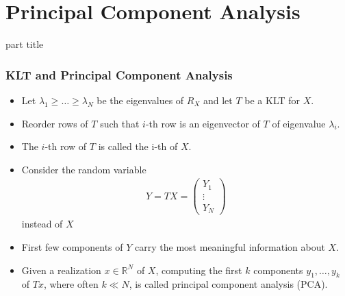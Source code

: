 \section{Principal Component Analysis}

\begin{frame}
 \vspace{12.0ex}
\begin{center}
\begin{beamercolorbox}[sep=12pt,center]{part title}
\insertsection\par
\end{beamercolorbox}
\end{center}
\end{frame}




\begin{frame}\frametitle{KLT and Principal Component Analysis}
\begin{itemize}
\item Let $\lambda_1\geq\dots\geq \lambda_N$ be the eigenvalues of $R_X$ and let $T$ be a KLT for $X$. 
\item Reorder 
rows of $T$ such that $i$-th row is an eigenvector of $T$ of eigenvalue $\lambda_i$.
\item The $i$-th row of $T$ is called the i-th  of $X$. 
\item Consider the random variable 
\begin{align*}
Y=TX=\begin{pmatrix}Y_1\\ \vdots\\Y_N\end{pmatrix}
\end{align*}
instead of $X$
\item First few components of $Y$ carry the most meaningful information 
about $X$.  
\item Given a realization $x\in\mathbb{R}^N$ of $X$, computing the first $k$ components $y_1,\dots,y_k$ of $Tx$,
where often $k\ll N$,  is called principal component analysis (PCA). 
\end{itemize}
\end{frame}


